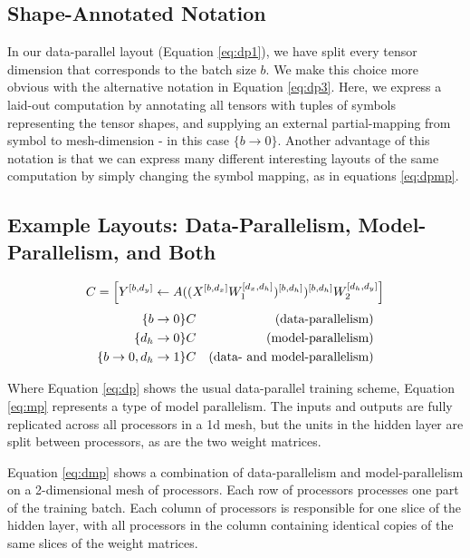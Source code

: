 \documentclass{article}
\begin{document}
\begin{itemize}
\subsection{Shape-Annotated Notation} \label{sec:notation}


In our data-parallel layout (Equation \ref{eq:dp1}), we have split every tensor dimension that corresponds to the batch size $b$.  We make this choice more obvious with the alternative notation in Equation \ref{eq:dp3}. 
Here, we express a laid-out computation by annotating all tensors with tuples of symbols representing the tensor shapes, and supplying an external partial-mapping from symbol to mesh-dimension - in this case $\{b \rightarrow 0\}$.  Another advantage of this notation is that we can express many different interesting layouts of the same computation by simply changing the symbol mapping, as in equations \ref{eq:dpmp}.

\subsection{Example Layouts: Data-Parallelism, Model-Parallelism, and Both} \label{sec:dpmp}


\def \TLM {\left[Y^\Yshape \gets A((X^\Xshape W_1^\Woneshape)^\Hshape)^\Hshape W_2^\Wtwoshape \right]}

$$C = \TLM$$
\begin{subequations}
\label{eq:dpmp}
\begin{align}
{{\{b \rightarrow 0\}}} C \label{eq:dp} &&\text{(data-parallelism)}\\
{{\{d_h \rightarrow 0\}}} C \label{eq:mp} &&\text{(model-parallelism)}\\
\{b \rightarrow 0, d_h \rightarrow 1\} C \label{eq:dmp} &&\text{(data- and model-parallelism)} 
\end{align}
\end{subequations}

Where Equation \ref{eq:dp} shows the usual data-parallel training scheme, Equation \ref{eq:mp} represents a type of model parallelism.  The inputs and outputs are fully replicated across all processors in a 1d mesh, but the units in the hidden layer are split between processors, as are the two weight matrices.
 
Equation \ref{eq:dmp} shows a combination of data-parallelism and model-parallelism on a 2-dimensional mesh of processors.  Each row of processors processes one part of the training batch.  Each column of processors is responsible for one slice of the hidden layer, with all processors in the column containing identical copies of the same slices of the weight matrices.  











\end{itemize}
\end{document}
